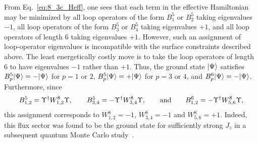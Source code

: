 From Eq.~\eqref{eq:8_3c_Heff}, one sees that each term in the effective Hamiltonian may be minimized by all loop operators of the form $B_1^5$ or $B_2^5$ taking eigenvalues $-1$, all loop operators of the form $B_3^5$ or $B_4^5$ taking eigenvalues $+1$, and all loop operators of length 6 taking eigenvalues $+1$.
However, such an assignment of loop-operator eigenvalues is incompatible with the surface constraints described above.
The least energetically costly move is to take the loop operators of length 6 to have eigenvalues $-1$ rather than $+1$.
Thus, the ground state $\ket{\Psi}$ satisfies $B_p^5 \ket{\Psi} = -\ket{\Psi}$ for $p=1$ or $2$, $B_p^5 \ket{\Psi} = +\ket{\Psi}$ for $p=3$ or $4$, and $B_p^6 \ket{\Psi} = -\ket{\Psi}$.
Furthermore, since
%
\begin{align}
B_{1,2}^5 = \Upsilon\dag W_{1,2}^8 \Upsilon, \qquad
B_{3,4}^5 = -\Upsilon\dag W_{3,4}^8 \Upsilon, \qquad{\rm and}\qquad
B_{1,2}^6 = - \Upsilon\dag W_{5,6}^8 \Upsilon,
\end{align}
%
this assignment corresponds to $W_{1,2}^8 = -1$, $W_{3,4}^8 = -1$ and $W_{5,6}^8 = +1$.
Indeed, this flux sector was found to be the ground state for sufficiently strong $J_z$ in a subsequent quantum Monte Carlo study~\cite{EschmannPRL2019}.